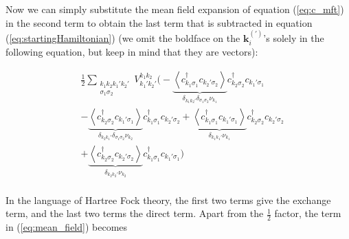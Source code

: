 \documentclass[10pt, twocolumn, twoside]{article}
\begin{document}
Now we can simply substitute the mean field expansion of equation (\ref{eq:c_mft}) in the second term to  obtain the last term that is subtracted in equation (\ref{eq:startingHamiltonian}) (we omit the boldface on the $\bm k_i^{(')}$'s solely in the following equation, but keep in mind that they are vectors):

\begin{equation}\label{eq:mean_field}
\begin{split}
&\frac{1}{2} \sum_{\substack{ k_1 k_2 k_1' k_2' \\ \sigma_1 \sigma_2} } V^{k_1 k_2}_{k_1' k_2'} \bigg( - \underbrace{\left\langle c_{k_1 \sigma_1}^\dagger c_{k_2' \sigma_2} \right\rangle}_{\delta_{k_1 k_2'} \delta_{\sigma_1 \sigma_2} \nu_{k_1} } c_{k_2 \sigma_2}^\dagger c_{k_1' \sigma_1} \\
& - \underbrace{\left\langle c_{k_2 \sigma_2}^\dagger c_{k_1' \sigma_1}  \right\rangle}_{\delta_{k_2 k_1'} \delta_{\sigma_1 \sigma_2} \nu_{k_2} } c_{k_1 \sigma_1}^\dagger c_{k_2' \sigma_2} + \underbrace{\left\langle c_{k_1 \sigma_1}^\dagger c_{k_1' \sigma_1} \right\rangle}_{\delta_{k_1 k_1'} \nu_{k_1} } c_{k_2 \sigma_2}^\dagger c_{k_2' \sigma_2}  \\
& + \underbrace{\left\langle c_{k_2 \sigma_2}^\dagger c_{k_2' \sigma_2} \right\rangle}_{\delta_{k_2 k_2'} \nu_{k_2} } c_{k_1 \sigma_1}^\dagger c_{k_1' \sigma_1} \bigg)\\
\end{split}
\end{equation}

In the language of Hartree Fock theory, the first two terms give the exchange term, and the last two terms the direct term. Apart from the $\frac{1}{2}$ factor, the term in (\ref{eq:mean_field}) becomes
\end{document}
